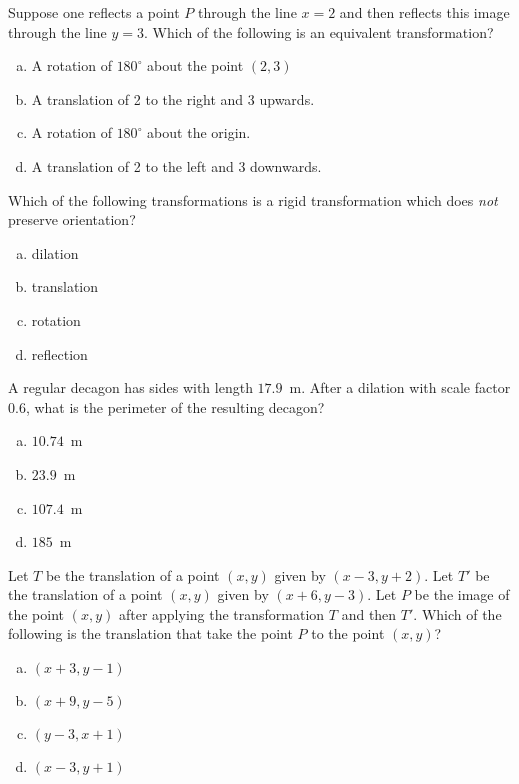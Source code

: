 \documentclass[12pt,letterpaper]{exam}
\begin{document}
\begin{questions}
\question Suppose one reflects a point $P$ through the line $x= 2$ and then reflects this image through the line $y= 3$. Which of the following is an equivalent transformation?
	\begin{enumerate}[(a)]
	\item A rotation of $180^\circ$ about the point $(2, 3)$
	\item A translation of 2 to the right and 3 upwards.
	\item A rotation of $180^\circ$ about the origin. 
	\item A translation of 2 to the left and 3 downwards. 
	\end{enumerate} \vfill



\question Which of the following transformations is a rigid transformation which does \textit{not} preserve orientation?
	\begin{enumerate}[(a)]
	\item dilation
	\item  translation 
	\item rotation 
	\item reflection 	
	\end{enumerate} \vfill



\newpage



\question A regular decagon has sides with length $17.9$~m. After a dilation with scale factor $0.6$, what is the perimeter of the resulting decagon?
	\begin{enumerate}[(a)]
	\item $10.74$~m
	\item $23.9$~m
	\item $107.4$~m
	\item $185$~m
	\end{enumerate} \vfill



\question Let $T$ be the translation of a point $(x, y)$ given by $(x - 3, y + 2)$. Let $T'$ be the translation of a point $(x, y)$ given by $(x + 6, y - 3)$. Let $P$ be the image of the point $(x, y)$ after applying the transformation $T$ and then $T'$. Which of the following is the translation that take the point $P$ to the point $(x, y)$?
	\begin{enumerate}[(a)]
	\item $(x + 3, y - 1)$
	\item $(x + 9, y - 5)$
	\item $(y - 3, x + 1)$
	\item $(x - 3, y + 1)$
	\end{enumerate} \vfill




\end{questions}
\end{document}
